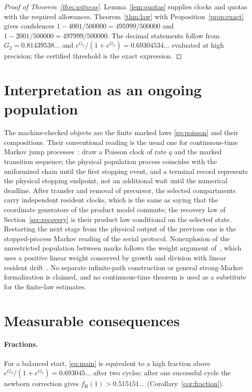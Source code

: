 \documentclass[11pt,a4paper]{article}
\theoremstyle{plain}
\theoremstyle{definition}
\theoremstyle{remark}
\newcommand{\hi}{\mathrm H}
\begin{document}
\begin{proof}[Proof of Theorem~\ref{thm:witness}]
Lemma~\ref{lem:quotas} supplies clocks and quotas with the required allowances. Theorem~\ref{thm:law} with Proposition~\ref{prop:exact} gives confidences $1-4001/500000=495999/500000$ and $1-2001/500000=497999/500000$. The decimal statements follow from $G_2=0.81439538\ldots$ and $e^{G_2}/(1+e^{G_2})=0.69304534\ldots$ evaluated at high precision; the certified threshold is the exact expression.
\end{proof}

\section{Interpretation as an ongoing population}\label{sec:localization}
The machine-checked objects are the finite marked laws \eqref{eq:poisson} and their compositions. Their conventional reading is the usual one for continuous-time Markov jump processes~\citep{kurtz1972,gillespie1977,andersonkurtz2015,norris1997}: draw a Poisson clock of rate $q$ and the marked transition sequence; the physical population process coincides with the uniformized chain until the first stopping event, and a terminal record represents the physical stopping endpoint, not an additional wait until the numerical deadline. After transfer and removal of precursor, the selected compartments carry independent resident clocks, which is the same as saying that the coordinate generators of the product model commute; the recovery law of Section~\ref{sec:recovery} is their product law conditional on the selected state. Restarting the next stage from the physical output of the previous one is the stopped-process Markov reading of the serial protocol. Nonexplosion of the unrestricted population between marks follows the weight argument of~\citep{batch2026}, which uses a positive linear weight conserved by growth and division with linear resident drift~\citep{ethierkurtz1986,meyntweedie1993}. No separate infinite-path construction or general strong-Markov formalization is claimed, and no continuous-time theorem is used as a substitute for the finite-law estimates.

\section{Measurable consequences}\label{sec:consequences}

\paragraph{Fractions.}
For a balanced start, \eqref{eq:main} is equivalent to a high fraction above $e^{G_2}/(1+e^{G_2})=0.693045\ldots$ after two cycles; after one successful cycle the newborn correction gives $f_\hi(1)>0.515151\ldots$ (Corollary~\ref{cor:fraction}).
\end{document}
